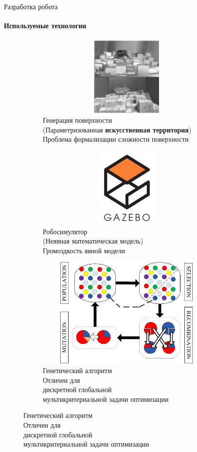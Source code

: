 \documentclass[aspectratio=169,xcolor=table]{beamer}
\begin{document}
\begin{frame}[c]{Разработка робота}
    \framesubtitle{Используемые технологии}
    \vspace{-0.7cm}
    \begin{figure}[H]
        \begin{subfigure}[t]{0.32\textwidth}
            \centering\includegraphics[height=4cm,width=1\textwidth,keepaspectratio]{c1_paper.png}
            \caption*{\small Генерация поверхности \\ (Параметризованная \textbf{искусственная территория}) \\ \alert{Проблема формализации сложности поверхности}}
        \end{subfigure}
        \hfill
        \begin{subfigure}[t]{0.32\textwidth}
            \centering\includegraphics[height=4cm,width=1\textwidth,keepaspectratio]{gazebo_logo.png}
            \caption*{\small Робосимулятор \\ (Неявная математическая модель) \\ \alert{Громоздкость явной модели}}
        \end{subfigure}
        \hfill
        \begin{subfigure}[t]{0.32\textwidth}
            \centering\includegraphics[height=5.5cm,width=1\textwidth,keepaspectratio]{gen_algo.jpg}
            \caption*{ \small Генетический алгоритм \\ \alert{Отличен для \\ дискретной глобальной \\ мультикритериальной задачи оптимизации}}
        \end{subfigure}
        \hfill
    \end{figure}
\end{frame}
\end{document}

